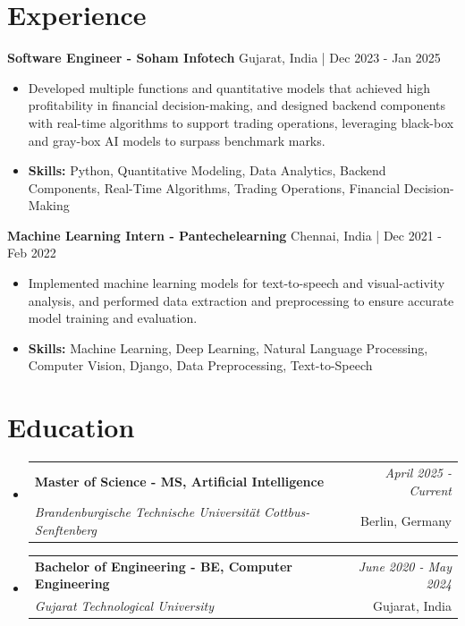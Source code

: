 \documentclass[a4paper,11pt]{article}
\makeatletter
\newcommand{\resumeSubheading}[4]{
\vspace{0.5mm}\item
    \begin{tabular*}{\linewidth}[t]{l@{\extracolsep{\fill}}r}
        \textbf{#1} & \textit{\footnotesize{#4}} \\
        \textit{\footnotesize{#3}} &  \footnotesize{#2}\\
    \end{tabular*}
    \vspace{-2.4mm}
}
\makeatother
\begin{document}
\section{\textbf{Experience}}


\vspace{1mm}
  \textbf{Software Engineer - Soham Infotech} \hfill Gujarat, India | Dec 2023 - Jan 2025
\vspace{-1.5mm} %
\begin{itemize}
  \item Developed multiple functions and quantitative models that achieved high profitability in financial decision-making, and designed backend components with real-time algorithms to support trading operations, leveraging black-box and gray-box AI models to surpass benchmark marks.

\vspace{-2mm}
  \item \textbf{Skills:} Python, Quantitative Modeling, Data Analytics, Backend Components, Real-Time Algorithms, Trading Operations, Financial Decision-Making
\end{itemize}

\vspace{1mm}
  \textbf{Machine Learning Intern - Pantechelearning} \hfill Chennai, India | Dec 2021 - Feb 2022
\vspace{-1.5mm} %
\begin{itemize}
  \item Implemented machine learning models for text-to-speech and visual-activity analysis, and performed data extraction and preprocessing to ensure accurate model training and evaluation.
\vspace{-2mm}
  \item \textbf{Skills:} Machine Learning, Deep Learning, Natural Language Processing, Computer Vision, Django, Data Preprocessing, Text-to-Speech
\end{itemize}\section{\textbf{Education}}
\vspace{-0.4mm}

\begin{itemize}[leftmargin=0.15in, label={}]
\resumeSubheading
{Master of Science - MS, Artificial Intelligence }{Berlin, Germany}
{Brandenburgische Technische Universität Cottbus-Senftenberg  }{April 2025 - Current}

\vspace{1.0mm} %
\resumeSubheading
{Bachelor of Engineering - BE, Computer Engineering  }{Gujarat, India}
{Gujarat Technological University }{June 2020 - May 2024}

\end{itemize}
\end{document}
